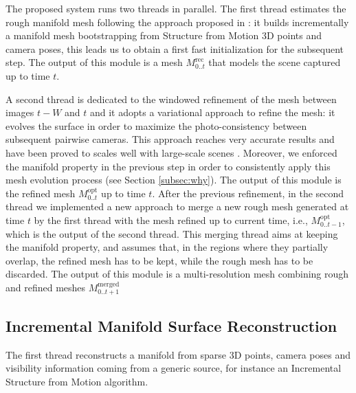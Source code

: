 The proposed system runs two threads in parallel.
The first thread estimates the rough manifold mesh following the approach proposed in \cite{litvinov_lhuillier_13,romanoni15a}: it builds incrementally a manifold mesh bootstrapping from Structure from Motion 3D points and camera poses, this leads us to obtain a first fast initialization for the subsequent step. The output of this module is a mesh $\mathit{M}_{0..t}^{\text{rec}}$ that models the scene captured up to time $t$.

A second thread is dedicated to the windowed refinement of the mesh between images $t-W$ and $t$ and it adopts a variational approach to refine the mesh: it evolves the surface in order to maximize the photo-consistency between subsequent pairwise cameras. This approach reaches very accurate results and have been proved to scales well with large-scale scenes \cite{vu2011large}.
Moreover, we enforced the manifold property in the previous step in order to  consistently apply this mesh evolution process (see Section \ref{subsec:why}). 
The output of this module is the refined mesh $\mathit{M}_{0..t}^{\text{opt}}$ up to time $t$.
After the previous refinement, in the second thread we implemented a new approach to merge a new rough mesh generated at time $t$ by the first thread with the mesh refined up to current time, i.e.,  $\mathit{M}_{0..t-1}^{\text{opt}}$, which is the output of the second thread. This merging thread aims at keeping the manifold property, and assumes that, in the regions where they partially overlap, the refined mesh has to be kept, while the rough mesh has to be discarded. 
The output of this module is a multi-resolution mesh combining rough and refined meshes $\mathit{M}_{0..t+1}^{\text{merged}}$



\subsection{Incremental Manifold Surface Reconstruction}
\label{sec:incremental_manifold}
The first thread reconstructs a manifold from sparse 3D points, camera poses and visibility information coming from a generic source, for instance an Incremental Structure from Motion algorithm. 

